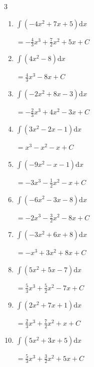 \begin{multicols}{3}
\begin{enumerate}
        $\displaystyle =\frac{7}{3}x^{3}+2x^{2}+4x+ C$

  \item $\displaystyle \int \left( -4x^{2}+7x+5 \right) \mathrm{d}x$

        $\displaystyle =-\frac{4}{3}x^{3}+\frac{7}{2}x^{2}+5x+ C$

  \item $\displaystyle \int \left( 4x^{2}-8 \right) \mathrm{d}x$

        $\displaystyle =\frac{4}{3}x^{3}-8x+ C$

  \item $\displaystyle \int \left( -2x^{2}+8x-3 \right) \mathrm{d}x$

        $\displaystyle =-\frac{2}{3}x^{3}+4x^{2}-3x+ C$

  \item $\displaystyle \int \left( 3x^{2}-2x-1 \right) \mathrm{d}x$

        $\displaystyle =x^{3}-x^{2}-x+ C$

  \item $\displaystyle \int \left( -9x^{2}-x-1 \right) \mathrm{d}x$

        $\displaystyle =-3x^{3}-\frac{1}{2}x^{2}-x+ C$

  \item $\displaystyle \int \left( -6x^{2}-3x-8 \right) \mathrm{d}x$

        $\displaystyle =-2x^{3}-\frac{3}{2}x^{2}-8x+ C$

  \item $\displaystyle \int \left( -3x^{2}+6x+8 \right) \mathrm{d}x$

        $\displaystyle =-x^{3}+3x^{2}+8x+ C$

  \item $\displaystyle \int \left( 5x^{2}+5x-7 \right) \mathrm{d}x$

        $\displaystyle =\frac{5}{3}x^{3}+\frac{5}{2}x^{2}-7x+ C$

  \item $\displaystyle \int \left( 2x^{2}+7x+1 \right) \mathrm{d}x$

        $\displaystyle =\frac{2}{3}x^{3}+\frac{7}{2}x^{2}+x+ C$

\columnbreak %

\resetques

  \item $\displaystyle \int \left( 5x^{2}+3x+5 \right) \mathrm{d}x$

        $\displaystyle =\frac{5}{3}x^{3}+\frac{3}{2}x^{2}+5x+ C$


\end{enumerate}
\end{multicols}
